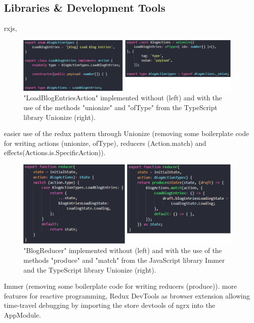 \documentclass[Bachelor,BIF,english]{twbook}
\begin{document}
\subsection{Libraries \& Development Tools}
rxjs,
\\[\baselineskip]
\begin{figure}[!htbp]
\centering
\includegraphics[width=1\linewidth]{PICs/without_and_with_unionize_actions.eps}
\caption{"LoadBlogEntriesAction" implemented without (left) and with the use of the methods "unionize" and "ofType" from the TypeScript library Unionize \cite{Unionize} (right).}\label{Fig4}
\end{figure}
easier use of the redux pattern through Unionize \cite{Unionize} (removing some boilerplate code for writing actions (unionize, ofType), reducers (Action.match) and effects(Actions.is.SpecificAction)).
\\[\baselineskip]
\begin{figure}[!htbp]
\centering
\includegraphics[width=1\linewidth]{PICs/with_and_without_immer_unionize_reducer.eps}
\caption{"BlogReducer" implemented without (left) and with the use of the methods "produce" and "match" from the JavaScript library Immer \cite{Immer} and the TypeScript library Unionize \cite{Unionize} (right).}\label{Fig5}
\end{figure}
Immer \cite{Immer} (removing some boilerplate code for writing reducers (produce)).
more features for reactive programming, Redux DevTools \cite{ReduxDevTools} as browser extension allowing time-travel debugging by importing the store devtools of ngrx into the AppModule.
\end{document}
